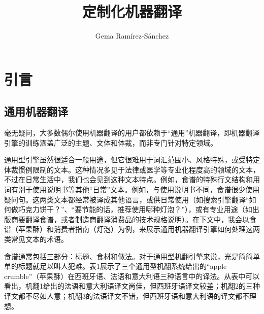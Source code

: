 \documentclass[output=paper]{langscibook}
\author{Gema Ramírez-Sánchez\affiliation{Prompsit Language Engineering}}
\title{定制化机器翻译}
\begin{document}
\maketitle

\section{引言}

\subsection{通用机器翻译}

毫无疑问，大多数偶尔使用机器翻译的用户都依赖于“通用”机器翻译，即机器翻译引擎的训练涵盖广泛的主题、文体和体裁，而非专门针对特定领域。 

通用型引擎虽然很适合一般用途，但它很难用于词汇范围小、风格特殊，或受特定体裁惯例限制的文本。这种情况多见于法律或医学等专业化程度高的领域的文本，不过在日常生活中，我们也会见到这种文本特点。例如，食谱的特殊行文结构和用词有别于使用说明书等其他“日常”文本。例如，与使用说明书不同，食谱很少使用疑问句。这两类文本都经常被译成其他语言，或供日常使用（如搜索引擎翻译“如何做巧克力饼干？”、“要节能的话，推荐使用哪种灯泡？”），或有专业用途（如出版商要翻译食谱，或者制造商翻译消费品的技术规格说明）。在下文中，我会以食谱（苹果酥）和消费者指南（灯泡）为例，来展示通用机器翻译引擎如何处理这两类常见文本的术语。

食谱通常包括三部分：标题、食材和做法。对于通用型机翻引擎来说，光是简简单单的标题就足以叫人犯难。表1展示了三个通用型机翻系统给出的“apple crumble”（苹果酥）在西班牙语、法语和意大利语三种语言中的译法。从表中可以看出，机翻1给出的法语和意大利语译文尚佳，但西班牙语译文较差；机翻2的三种译文都不尽如人意；机翻3的法语译文不错，但西班牙语和意大利语的译文都不理想。
\end{document}

